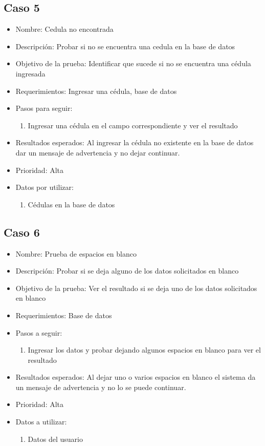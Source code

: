 \documentclass[conference]{IEEEtran}
\begin{document}
\subsection{Caso 5}
\begin{itemize}
\item Nombre: Cedula no encontrada 
\item Descripción: Probar si no se encuentra una cedula en la base de datos
\item Objetivo de la prueba: Identificar que sucede si no se encuentra una cédula ingresada 
\item Requerimientos: Ingresar una cédula, base de datos 
\item Pasos para seguir: 
\begin{enumerate}
\item Ingresar una cédula en el campo correspondiente y ver el resultado 
\end{enumerate}
\item Resultados esperados: Al ingresar la cédula no existente en la base de datos dar un mensaje de advertencia y no dejar continuar. 
\item Prioridad: Alta
\item Datos por utilizar: 
\begin{enumerate}
\item Cédulas en la base de datos 
\end{enumerate}
\end{itemize}

\subsection{Caso 6}
\begin{itemize}
\item Nombre: Prueba de espacios en blanco 
\item Descripción: Probar si se deja alguno de los datos solicitados en blanco
\item Objetivo de la prueba: Ver el resultado si se deja uno de los datos solicitados en blanco 
\item Requerimientos: Base de datos 
\item Pasos a seguir:
\begin{enumerate}
\item Ingresar los datos y probar dejando algunos espacios en blanco para ver el resultado
\end{enumerate}
\item Resultados esperados: Al dejar uno o varios espacios en blanco el sistema da un mensaje de advertencia y no lo se puede continuar.
\item Prioridad: Alta
\item Datos a utilizar:
\begin{enumerate}
\item Datos del usuario 
\end{enumerate}

\end{itemize}
\end{document}
